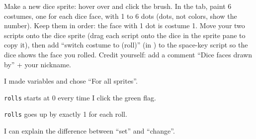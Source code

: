 \begin{creative}
Make a new dice sprite: hover over  and click the  brush. In the  tab, paint 6 costumes, one for each dice face, with 1 to 6 dots (dots, not colors, show the number). Keep them in order: the face with 1 dot is costume 1. Move your two scripts onto the dice sprite (drag each script onto the dice in the sprite pane to copy it), then add \enquote{switch costume to (roll)} (in ) to the space-key script so the dice shows the face you rolled. Credit yourself: add a comment \enquote{Dice faces drawn by} + your nickname.
\end{creative}

\begin{selfcheck}
  \item I made variables and chose \enquote{For all sprites}.
  \item \texttt{rolls} starts at 0 every time I click the green flag.
  \item \texttt{rolls} goes up by exactly 1 for each roll.
  \item I can explain the difference between \enquote{set} and \enquote{change}.
\end{selfcheck}
